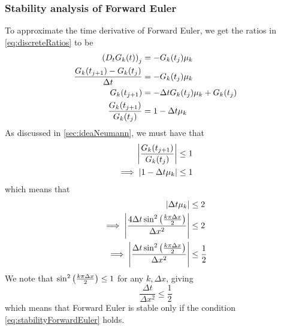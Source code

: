 \subsubsection{Stability analysis of Forward Euler}\label{forwardstability}

To approximate the time derivative of Forward Euler, we get the ratios in \ref{eq:discreteRatios} to be
\begin{align*}
\qty(D_tG_k(t))_j &= -G_k(t_j)\mu_k \\
\frac{G_k(t_{j+1}) - G_k(t_j) }{\Delta t} &= -G_k(t_j)\mu_k \\
G_k(t_{j+1}) &= -\Delta t G_k(t_j)\mu_k + G_k(t_j) \\
\frac{G_k(t_{j+1}) }{G_k(t_j)} &= 1-\Delta t \mu_k
\end{align*}
As discussed in \vref{sec:ideaNeumann}, we must have that
\begin{align*}
\abs{\frac{G_k(t_{j+1}) }{G_k(t_j)}} &\leq 1 \\
\implies \abs{1-\Delta t \mu_k} &\leq 1  \\
\end{align*}
which means that
\begin{align*}
\abs{\Delta t \mu_k} &\leq 2\\
\implies \abs{\frac{4 \Delta t \sin^2\qty(\frac{k\pi \Delta x}{2})}{\Delta x^2} } &\leq 2 \\
\implies \abs{\frac{\Delta t \sin^2\qty(\frac{k\pi \Delta x}{2})}{\Delta x^2} } &\leq \frac{1}{2}
\end{align*}
We note that \(\sin^2\qty(\frac{k\pi \Delta x}{2}) \leq 1\) for any \(k,\Delta x\), giving
\begin{equation}\label{eq:stabilityForwardEuler}
\frac{\Delta t}{\Delta x^2} \leq \frac{1}{2}
\end{equation}
which means that Forward Euler is stable only if the condition \vref{eq:stabilityForwardEuler} holds.
